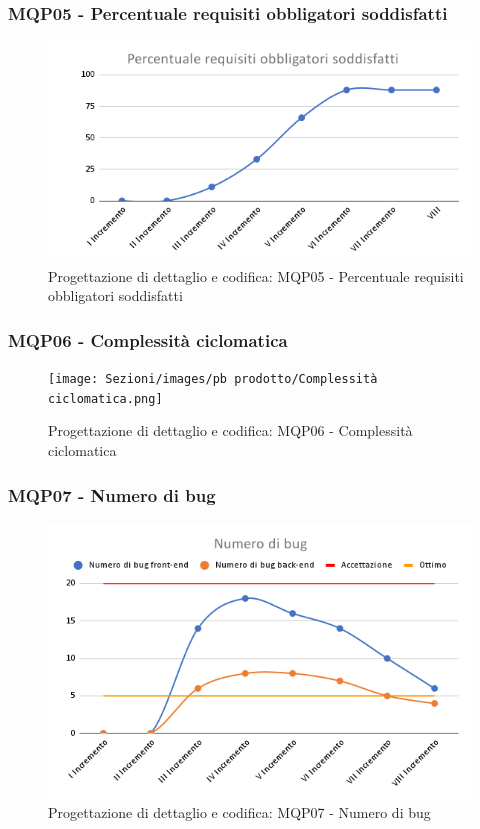 \subsubsection{MQP05 - Percentuale requisiti obbligatori soddisfatti}
\begin{figure}[H]
    \centering
    \includegraphics[scale=0.50]{Sezioni/images/pb prodotto/Percentuale requisiti obbligatori soddisfatti.png}
    \caption{Progettazione di dettaglio e codifica: MQP05 - Percentuale requisiti obbligatori soddisfatti}
\end{figure}
\subsubsection{MQP06 - Complessità ciclomatica}
\begin{figure}[H]
    \centering
    \texttt{[image: Sezioni/images/pb prodotto/Complessità ciclomatica.png]}
    \caption{Progettazione di dettaglio e codifica: MQP06 - Complessità ciclomatica}
\end{figure}
\subsubsection{MQP07 - Numero di bug}
\begin{figure}[H]
    \centering
    \includegraphics[scale=0.50]{Sezioni/images/pb prodotto/Numero di bug.png}
    \caption{Progettazione di dettaglio e codifica: MQP07 - Numero di bug}
\end{figure}
